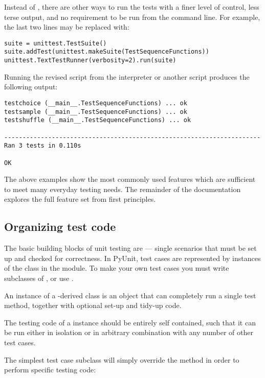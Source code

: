 Instead of , there are other ways to run the tests
with a finer level of control, less terse output, and no requirement to be
run from the command line.  For example, the last two lines may be replaced
with:

\begin{verbatim}
suite = unittest.TestSuite()
suite.addTest(unittest.makeSuite(TestSequenceFunctions))
unittest.TextTestRunner(verbosity=2).run(suite)
\end{verbatim}

Running the revised script from the interpreter or another script
produces the following output:

\begin{verbatim}
testchoice (__main__.TestSequenceFunctions) ... ok
testsample (__main__.TestSequenceFunctions) ... ok
testshuffle (__main__.TestSequenceFunctions) ... ok

----------------------------------------------------------------------
Ran 3 tests in 0.110s

OK
\end{verbatim}

The above examples show the most commonly used  features
which are sufficient to meet many everyday testing needs.  The remainder
of the documentation explores the full feature set from first principles.


\subsection{Organizing test code
            \label{organizing-tests}}

The basic building blocks of unit testing are  ---
single scenarios that must be set up and checked for correctness.  In
PyUnit, test cases are represented by instances of the
 class in the  module. To make
your own test cases you must write subclasses of , or
use .

An instance of a -derived class is an object that can
completely run a single test method, together with optional set-up
and tidy-up code.

The testing code of a  instance should be entirely
self contained, such that it can be run either in isolation or in
arbitrary combination with any number of other test cases.

The simplest test case subclass will simply override the
 method in order to perform specific testing code:


